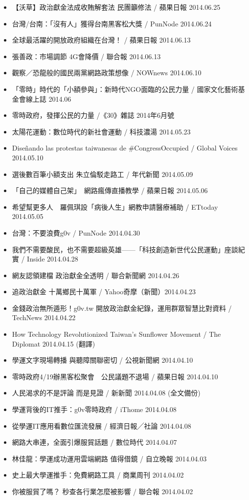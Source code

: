 \begin{itemize}
\item【沃草】政治獻金法成收賄解套法 民團籲修法 / 蘋果日報 2014.06.25
\item 台灣/台南：「沒有人」獲得台南黑客松大獎 / PunNode 2014.06.24
\item 全球最活躍的開放政府組織在台灣！ / 蘋果日報 2014.06.13
\item 張善政：市場調節 4G會降價 / 聯合報 2014.06.13
\item 觀察／恐龍般的國民兩黨網路政策想像 / NOWnews 2014.06.10
\item 「零時」時代的「小額參與」：新時代NGO面臨的公民力量 / 國家文化藝術基金會線上誌 2014.06
\item 零時政府，發揮公民的力量 /《30》雜誌 2014年6月號
\item 太陽花運動：數位時代的新社會運動 / 科技濃湯 2014.05.23
\item Diseñando las protestas taiwanesas de \#CongressOccupied / Global Voices 2014.05.10
\item 選後數百筆小額支出 朱立倫駁走路工 / 年代新聞 2014.05.09
\item 「自己的媒體自己架」　網路瘋傳直播教學 / 蘋果日報 2014.05.06
\item 希望幫更多人　羅佩琪設「病後人生」網教申請醫療補助 / ETtoday 2014.05.05
\item 台灣：不要浪費g0v / PunNode 2014.04.30
\item 我們不需要酸民，也不需要超級英雄——「科技創造新世代公民運動」座談紀實 / Inside 2014.04.28
\item 網友認領建檔 政治獻金全透明 / 聯合新聞網 2014.04.26
\item 追政治獻金 十萬鄉民十萬軍 / Yahoo奇摩（新聞）2014.04.23
\item 金錢政治無所遁形！g0v.tw 開放政治獻金紀錄，運用群眾智慧比對資料 / TechNews 2014.04.22
\item How Technology Revolutionized Taiwan’s Sunflower Movement / The Diplomat 2014.04.15 (翻譯)
\item 學運文字現場轉播 與聽障關聯密切 / 公視新聞網 2014.04.10
\item 零時政府4/19辦黑客松聚會　公民議題不退場 / 蘋果日報 2014.04.10
\item 人民渴求的不是評論 而是見證 / 新新聞 2014.04.08 (全文備份)
\item 學運背後的IT推手：g0v零時政府 / iThome 2014.04.08
\item 從學運IT應用看數位匯流發展 / 經濟日報╱社論 2014.04.08
\item 網路大串連，全面引爆服貿話題 / 數位時代 2014.04.07
\item 林佳龍：學運成功運用雲端網路 值得借鏡 / 自立晚報 2014.04.03
\item 史上最大學運推手：免費網路工具 / 商業周刊 2014.04.02
\item 你被服貿了嗎？ 秒查各行業怎麼被影響 / 聯合報 2014.04.02
\end{itemize}


